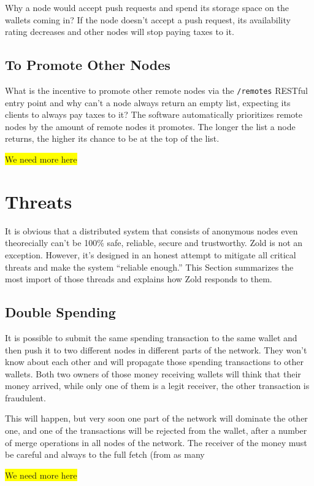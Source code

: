 \documentclass[11pt,oneside]{article}
\newcommand\dd[1]{\colorbox{gray!30}{\texttt{#1}}}
\begin{document}
Why a node would accept push requests and spend its storage space
on the wallets coming in? If the node doesn't accept a push request,
its availability rating decreases and other nodes will stop paying
taxes to it.

\subsection{To Promote Other Nodes}

What is the incentive to promote other remote nodes via the \dd{/remotes} RESTful
entry point and why can't a node always return an empty list, expecting its clients
to always pay taxes to it? The software automatically prioritizes remote
nodes by the amount of remote nodes it promotes. The longer the list a node
returns, the higher its chance to be at the top of the list.

\colorbox{yellow}{We need more here}

\section{Threats}

It is obvious that a distributed system that consists of anonymous nodes
even theorecially can't be 100\% safe, reliable, secure and trustworthy.
Zold is not an exception. However, it's designed in an honest attempt
to mitigate all critical threats and make the system ``reliable enough.''
This Section summarizes the most import of those threads and explains
how Zold responds to them.

\subsection{Double Spending}

It is possible to submit the same spending transaction to the same wallet
and then push it to two different nodes in different parts of the network.
They won't know about each other and will propagate those spending
transactions to other wallets. Both two owners of those money receiving
wallets will think that their money arrived, while only one of them is
a legit receiver, the other transaction is fraudulent.

This will happen, but very soon one part of the network will dominate the other
one, and one of the transactions will be rejected from the wallet, after
a number of merge operations in all nodes of the network. The receiver of the
money must be careful and always to the full fetch (from as many

\colorbox{yellow}{We need more here}
\end{document}
